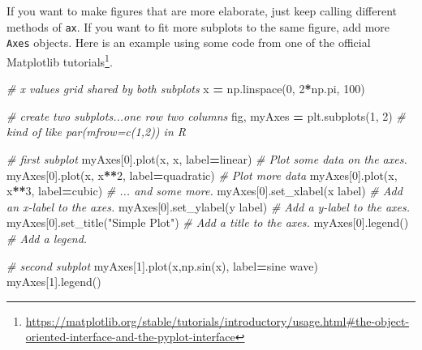 \documentclass[
  12pt,
  krantz2]{krantz}
\makeatletter
\newenvironment{Shaded}{\begin{snugshade}}{\end{snugshade}}
\newcommand{\CommentTok}[1]{\textcolor[rgb]{0.37,0.37,0.37}{\textit{#1}}}
\newcommand{\DecValTok}[1]{\textcolor[rgb]{0.06,0.06,0.06}{#1}}
\newcommand{\NormalTok}[1]{#1}
\newcommand{\OperatorTok}[1]{\textcolor[rgb]{0.43,0.43,0.43}{\textbf{#1}}}
\newcommand{\StringTok}[1]{\textcolor[rgb]{0.5,0.5,0.5}{#1}}
\renewcommand{\href}[2]{#2\footnote{\url{#1}}}
\newenvironment{kframe}{%
\medskip{}
\setlength{\fboxsep}{.8em}
 \def\at@end@of@kframe{}%
 \ifinner\ifhmode%
  \def\at@end@of@kframe{\end{minipage}}%
  \begin{minipage}{\columnwidth}%
 \fi\fi%
 \def\FrameCommand##1{\hskip\@totalleftmargin \hskip-\fboxsep
 \colorbox{shadecolor}{##1}\hskip-\fboxsep
     \hskip-\linewidth \hskip-\@totalleftmargin \hskip\columnwidth}%
 \MakeFramed {\advance\hsize-\width
   \@totalleftmargin\z@ \linewidth\hsize
   \@setminipage}}%
 {\par\unskip\endMakeFramed%
 \at@end@of@kframe}
\renewenvironment{Shaded}{\begin{kframe}}{\end{kframe}}
\makeatother
\begin{document}
If you want to make figures that are more elaborate, just keep calling different methods of \texttt{ax}. If you want to fit more subplots to the same figure, add more \texttt{Axes} objects. Here is an example using some code from \href{https://matplotlib.org/stable/tutorials/introductory/usage.html\#the-object-oriented-interface-and-the-pyplot-interface}{one of the official Matplotlib tutorials}.

\begin{Shaded}
\begin{Highlighting}[]
\CommentTok{\# x values grid shared by both subplots}
\NormalTok{x }\OperatorTok{=}\NormalTok{ np.linspace(}\DecValTok{0}\NormalTok{, }\DecValTok{2}\OperatorTok{*}\NormalTok{np.pi, }\DecValTok{100}\NormalTok{) }

\CommentTok{\# create two subplots...one row two columns}
\NormalTok{fig, myAxes }\OperatorTok{=}\NormalTok{ plt.subplots(}\DecValTok{1}\NormalTok{, }\DecValTok{2}\NormalTok{) }\CommentTok{\# kind of like par(mfrow=c(1,2)) in R}

\CommentTok{\# first subplot}
\NormalTok{myAxes[}\DecValTok{0}\NormalTok{].plot(x, x, label}\OperatorTok{=}\StringTok{\textquotesingle{}linear\textquotesingle{}}\NormalTok{)  }\CommentTok{\# Plot some data on the axes.}
\NormalTok{myAxes[}\DecValTok{0}\NormalTok{].plot(x, x}\OperatorTok{**}\DecValTok{2}\NormalTok{, label}\OperatorTok{=}\StringTok{\textquotesingle{}quadratic\textquotesingle{}}\NormalTok{)  }\CommentTok{\# Plot more data }
\NormalTok{myAxes[}\DecValTok{0}\NormalTok{].plot(x, x}\OperatorTok{**}\DecValTok{3}\NormalTok{, label}\OperatorTok{=}\StringTok{\textquotesingle{}cubic\textquotesingle{}}\NormalTok{)  }\CommentTok{\# ... and some more.}
\NormalTok{myAxes[}\DecValTok{0}\NormalTok{].set\_xlabel(}\StringTok{\textquotesingle{}x label\textquotesingle{}}\NormalTok{)  }\CommentTok{\# Add an x{-}label to the axes.}
\NormalTok{myAxes[}\DecValTok{0}\NormalTok{].set\_ylabel(}\StringTok{\textquotesingle{}y label\textquotesingle{}}\NormalTok{)  }\CommentTok{\# Add a y{-}label to the axes.}
\NormalTok{myAxes[}\DecValTok{0}\NormalTok{].set\_title(}\StringTok{"Simple Plot"}\NormalTok{)  }\CommentTok{\# Add a title to the axes.}
\NormalTok{myAxes[}\DecValTok{0}\NormalTok{].legend()  }\CommentTok{\# Add a legend.}

\CommentTok{\# second subplot}
\NormalTok{myAxes[}\DecValTok{1}\NormalTok{].plot(x,np.sin(x), label}\OperatorTok{=}\StringTok{\textquotesingle{}sine wave\textquotesingle{}}\NormalTok{)}
\NormalTok{myAxes[}\DecValTok{1}\NormalTok{].legend()}
\end{Highlighting}
\end{Shaded}
\end{document}
